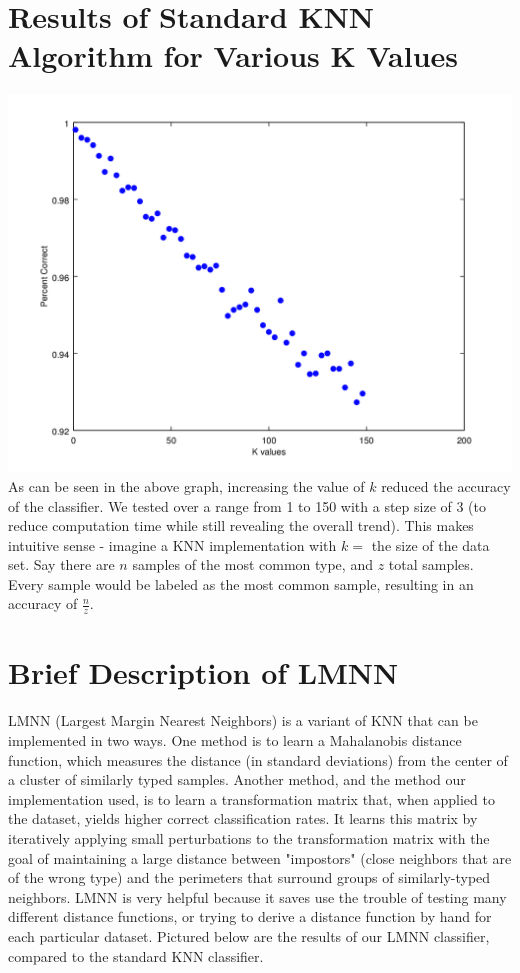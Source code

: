 \documentclass[11pt]{article}
\begin{document}
\section*{Results of Standard KNN Algorithm for Various K Values}
\includegraphics[scale=.75]{kValuesGraph.png}
\\
As can be seen in the above graph, increasing the value of $k$ reduced the accuracy of the classifier. We tested over a range from 1 to 150 with a step size of 3 (to reduce computation time while still revealing the overall trend). This makes intuitive sense - imagine a KNN implementation with $k = $ the size of the data set. Say there are $n$ samples of the most common type, and $z$ total samples. Every sample would be labeled as the most common sample, resulting in an accuracy of $\frac{n}{z}$.
\section*{Brief Description of LMNN}
LMNN (Largest Margin Nearest Neighbors) is a variant of KNN that can be implemented in two ways. One method is to learn a Mahalanobis distance function, which measures the distance (in standard deviations) from the center of a cluster of similarly typed samples. Another method, and the method our implementation used, is to learn a transformation matrix that, when applied to the dataset, yields higher correct classification rates. It learns this matrix by iteratively applying small perturbations to the transformation matrix with the goal of maintaining a large distance between "impostors" (close neighbors that are of the wrong type) and the perimeters that surround groups of similarly-typed neighbors. LMNN is very helpful because it saves use the trouble of testing many different distance functions, or trying to derive a distance function by hand for each particular dataset. Pictured below are the results of our LMNN classifier, compared to the standard KNN classifier.
\end{document}
